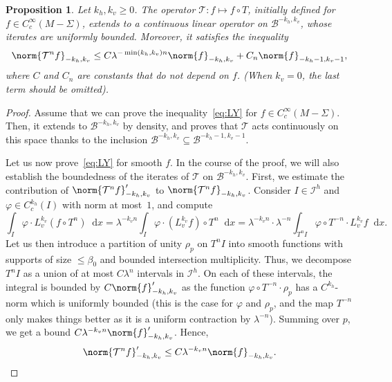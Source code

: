 \documentclass[10pt]{amsart}
\newcommand{\boI}{\mathcal{I}}
\newcommand{\boB}{\mathcal{B}}
\newcommand{\boT}{\mathcal{T}}
\newcommand{\dd}{\mathop{}\!\mathrm{d}}
\let\phi\varphi
\newtheorem{prop}[thm]{Proposition}
\theoremstyle{definition}
\numberwithin{equation}{section}
\begin{document}
\begin{prop}
\label{prop:LY} Let $k_h, k_v \geq 0$. The operator $\boT : f \mapsto f \circ
T$, initially defined for $f \in C^\infty_c(M-\Sigma)$, extends to a
continuous linear operator on $\boB^{-k_h, k_v}$, whose iterates are
uniformly bounded. Moreover, it satisfies the inequality
\begin{equation}
\label{eq:LY}
\norm{\boT^n f}_{-k_h, k_v} \leq C \lambda^{-\min(k_h, k_v) n} \norm{f}_{-k_h, k_v} + C_n \norm{f}_{-k_h-1, k_v-1},
\end{equation}
where $C$ and $C_n$ are constants that do not depend on $f$. (When $k_v=0$,
the last term should be omitted).
\end{prop}
\begin{proof}
Assume that we can prove the inequality~\eqref{eq:LY} for $f \in
C^\infty_c(M-\Sigma)$. Then, it extends to $\boB^{-k_h, k_v}$ by density, and
proves that $\boT$ acts continuously on this space thanks to the inclusion
$\boB^{-k_h, k_v} \subseteq \boB^{-k_h-1, k_v-1}$.

Let us now prove~\eqref{eq:LY} for smooth $f$. In the course of the proof, we
will also establish the boundedness of the iterates of $\boT$ on $\boB^{-k_h,
k_v}$. First, we estimate the contribution of $\norm{\boT^n f}'_{-k_h, k_v}$
to $\norm{\boT^n f}_{-k_h, k_v}$. Consider $I \in \boI^h$ and $\phi \in
C^{k_h}_c(I)$ with norm at most~$1$, and compute
\begin{equation*}
\int_I \!\phi \cdot L_v^{k_v}(f \circ T^n) \dd x
= \lambda^{-k_v n} \int_I \!\phi \cdot (L_v^{k_v} f) \circ T^n \dd x
= \lambda^{-k_v n} \cdot \lambda^{-n} \int_{T^n I}\!\phi \circ T^{-n} \cdot L_v^{k_v}f \dd x.
\end{equation*}
Let us then introduce a partition of unity $\rho_p$ on $T^n I$ into smooth
functions with supports of size $\leq \beta_0$ and bounded intersection
multiplicity. Thus, we decompose $T^n I$ as a union of at most $C \lambda^n$
intervals in $\boI^h$. On each of these intervals, the integral is bounded by
$C \norm{f}'_{-k_h, k_v}$ as the function $\phi \circ T^{-n} \cdot \rho_p$
has a $C^{k_h}$-norm which is uniformly bounded (this is the case for $\phi$
and $\rho_p$, and the map $T^{-n}$ only makes things better as it is a
uniform contraction by $\lambda^{-n}$). Summing over $p$, we get a bound $C
\lambda^{-k_v n} \norm{f}'_{-k_h, k_v}$. Hence,
\begin{equation}
\label{eq:ksprime}
\norm{\boT^n f}'_{-k_h, k_v} \leq C \lambda^{-k_v n} \norm{f}_{-k_h, k_v}.
\end{equation}


\end{proof}
\end{document}
